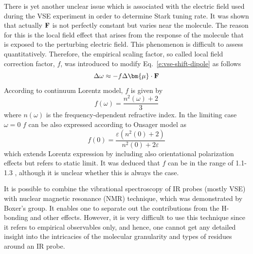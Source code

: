 \documentclass[a4paper,titlepage,twoside,fleqn,12pt]{book}
\newcommand{\BM}[1]{\bm{#1}}
\begin{document}
\begin{refsection}
There is yet another unclear issue which is associated with the electric field
used during the VSE experiment in order to determine Stark tuning rate.
It was shown that actually ${\bf F}$ is not perfectly constant but varies
near the molecule. The reason for this is the local field effect that arises
from the response of the molecule that is exposed to the perturbing electric field.
This phenomenon is difficult to assess quantitatively. Therefore, 
the empirical scaling factor, so called local field correction factor, $f$, 
was introduced to modify Eq.~\eqref{e:vse-shift-dipole} as follows
%
\begin{equation} \label{e:vse-shift-dipole-corr}
 \Delta \omega \approx - f \Delta {\BM \mu} \cdot {\bf F}
\end{equation}
%
According to continuum Lorentz model, $f$ is given by \citep{Wortmann.Bishop.JCP.1998}
%
\begin{equation}
f(\omega) = \frac{n^2(\omega)+2}{3}
\end{equation}
%
where $n(\omega)$ is the frequency\hyp{}dependent refractive index.
In the limiting case $\omega=0$ $f$ can be also expressed according to Onsager
model as \citep{Wortmann.Bishop.JCP.1998}
%
\begin{equation}
f(0) = \frac{\varepsilon (n^2(0)+2)}{n^2(0)+2\varepsilon}
\end{equation}
%
which extends Lorentz expression by including also orientational polarization effects
but refers to static limit.
It was deduced that $f$ can be in the range of 1.1-1.3 \citep{Wortmann.Bishop.JCP.1998,
Bublitz.Boxer.AnnuRevPhysChem.1997}, although
it is unclear whether this is always the case.

It is possible to combine the vibrational spectroscopy of IR probes (mostly VSE) with nuclear magnetic 
resonance (NMR) technique, which was demonstrated by Boxer's 
group. \citep{Fafarman.Sigala.Herschlag.Boxer.JACS.2010,Bagchi.Fried.Boxer.JACS.2012} 
It enables one
to separate out the contributions from the H\hyp{}bonding and other effects. However, 
it is very difficult to use this technique since it refers to empirical observables only,
and hence, one cannot get any detailed insight into the intricacies of the molecular granularity
and types of residues around an IR probe.


\end{refsection}
\end{document}
